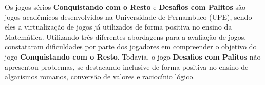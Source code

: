 \documentclass[alpha-refs,brazilian]{RBCA_v2.0}
\begin{document}
Os jogos sérios \textbf{Conquistando com o Resto} e \textbf{Desafios com Palitos} são jogos acadêmicos desenvolvidos na Universidade de Pernambuco (UPE), sendo eles a virtualização de jogos já utilizados de forma positiva no ensino da Matemática. Utilizando três diferentes abordagens para a avaliação de jogos, \cite{oliveira2015avaliaccao} constataram dificuldades por parte dos jogadores em compreender o objetivo do jogo \textbf{Conquistando com o Resto}. Todavia, o jogo \textbf{Desafios com Palitos} não apresentou problemas, se destacando inclusive de forma positiva no ensino de algarismos romanos, conversão de valores e raciocínio lógico.

\newpage
\newcommand\x{3.1 cm}
\newcommand\xx{3.2 cm}
\newcommand\y{4.2 cm}
\newcommand\yy{3 cm}
\newcommand\z{1.9 cm}
\newcommand\zz{6 cm}
\end{document}
